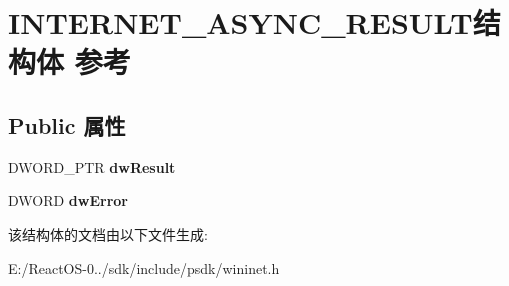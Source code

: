 \hypertarget{struct_i_n_t_e_r_n_e_t___a_s_y_n_c___r_e_s_u_l_t}{}\section{I\+N\+T\+E\+R\+N\+E\+T\+\_\+\+A\+S\+Y\+N\+C\+\_\+\+R\+E\+S\+U\+L\+T结构体 参考}
\label{struct_i_n_t_e_r_n_e_t___a_s_y_n_c___r_e_s_u_l_t}
\subsection*{Public 属性}
\begin{DoxyCompactItemize}
\item 
\mbox{\label{struct_i_n_t_e_r_n_e_t___a_s_y_n_c___r_e_s_u_l_t_a6621c18c24319686c63734790bdad50e}} 
D\+W\+O\+R\+D\+\_\+\+P\+TR {\bfseries dw\+Result}
\item 
\mbox{\label{struct_i_n_t_e_r_n_e_t___a_s_y_n_c___r_e_s_u_l_t_a34ba389e479d2bd17dadac6b7ee59553}} 
D\+W\+O\+RD {\bfseries dw\+Error}
\end{DoxyCompactItemize}


该结构体的文档由以下文件生成\+:\begin{DoxyCompactItemize}
\item 
E\+:/\+React\+O\+S-\/0../sdk/include/psdk/wininet.\+h\end{DoxyCompactItemize}
